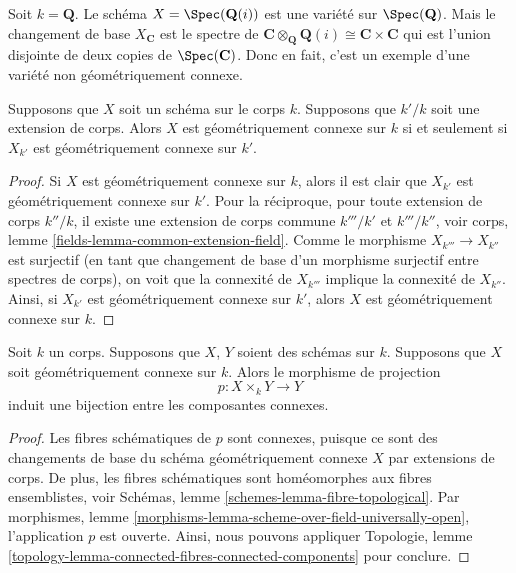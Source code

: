 \begin{example}
\label{example-not-geometrically-irreducible}
Soit $k = \mathbf{Q}$. Le schéma $X =
\Spec(\mathbf{Q}(i))$ est une variété sur
$\Spec(\mathbf{Q})$. Mais le changement de base
$X_{\mathbf{C}}$ est le spectre de $\mathbf{C}
\otimes_{\mathbf{Q}} \mathbf{Q}(i) \cong \mathbf{C} \times \mathbf{C}$
qui est l'union disjointe de deux copies de $\Spec(\mathbf{C})$. Donc
en fait, c'est un exemple d'une variété non géométriquement connexe.
\end{example}

\begin{lemma}
\label{lemma-geometrically-connected-check-after-extension}
Supposons que $X$ soit un schéma sur le corps $k$.
Supposons que $k'/k$ soit une extension de corps.
Alors $X$ est géométriquement connexe sur $k$ si et
seulement si $X_{k'}$ est géométriquement connexe sur $k'$.
\end{lemma}

\begin{proof}
Si $X$ est géométriquement connexe sur $k$, alors il est clair
que $X_{k'}$ est géométriquement connexe sur $k'$. Pour la
réciproque, pour toute extension de corps $k''/k$, il existe
une extension de corps commune $k'''/k'$ et $k'''/k''$, voir
corps, lemme \ref{fields-lemma-common-extension-field}. Comme
le morphisme $X_{k'''} \to X_{k''}$ est surjectif (en tant que
changement de base d'un morphisme surjectif entre spectres de
corps), on voit que la connexité de $X_{k'''}$ implique la
connexité de $X_{k''}$. Ainsi, si $X_{k'}$ est géométriquement
connexe sur $k'$, alors $X$ est géométriquement connexe sur $k$.
\end{proof}

\begin{lemma}
\label{lemma-bijection-connected-components}
Soit $k$ un corps. Supposons
que $X$, $Y$ soient des schémas sur $k$.
Supposons que $X$ soit géométriquement
connexe sur $k$. Alors le morphisme de projection
$$
p : X \times_k Y \longrightarrow Y
$$
induit une bijection entre les composantes connexes.
\end{lemma}

\begin{proof}
Les fibres schématiques de $p$ sont connexes,
puisque ce sont des changements de base du
schéma géométriquement connexe $X$ par
extensions de corps. De plus, les fibres
schématiques sont homéomorphes aux fibres
ensemblistes, voir Schémas, lemme
\ref{schemes-lemma-fibre-topological}. Par morphismes,
lemme
\ref{morphisms-lemma-scheme-over-field-universally-open},
l'application $p$ est ouverte. Ainsi, nous pouvons appliquer Topologie,
lemme \ref{topology-lemma-connected-fibres-connected-components} pour conclure.
\end{proof}

